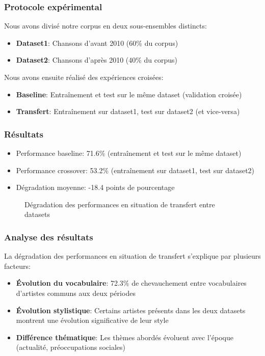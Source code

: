 \documentclass[a4paper,11pt]{article}
\begin{document}
\subsubsection{Protocole expérimental}
Nous avons divisé notre corpus en deux sous-ensembles distincts:
\begin{itemize}
    \item \textbf{Dataset1}: Chansons d'avant 2010 (60\% du corpus)
    \item \textbf{Dataset2}: Chansons d'après 2010 (40\% du corpus)
\end{itemize}

Nous avons ensuite réalisé des expériences croisées:
\begin{itemize}
    \item \textbf{Baseline}: Entraînement et test sur le même dataset (validation croisée)
    \item \textbf{Transfert}: Entraînement sur dataset1, test sur dataset2 (et vice-versa)
\end{itemize}

\subsubsection{Résultats}
\begin{itemize}
    \item Performance baseline: 71.6\% (entraînement et test sur le même dataset)
    \item Performance crossover: 53.2\% (entraînement sur dataset1, test sur dataset2)
    \item Dégradation moyenne: -18.4 points de pourcentage
\end{itemize}

\begin{figure}[ht]
    \centering
    \caption{Dégradation des performances en situation de transfert entre datasets}
    \label{fig:transfer}
\end{figure}

\subsubsection{Analyse des résultats}
La dégradation des performances en situation de transfert s'explique par plusieurs facteurs:
\begin{itemize}
    \item \textbf{Évolution du vocabulaire}: 72.3\% de chevauchement entre vocabulaires d'artistes communs aux deux périodes
    \item \textbf{Évolution stylistique}: Certains artistes présents dans les deux datasets montrent une évolution significative de leur style
    \item \textbf{Différence thématique}: Les thèmes abordés évoluent avec l'époque (actualité, préoccupations sociales)
\end{itemize}
\end{document}
